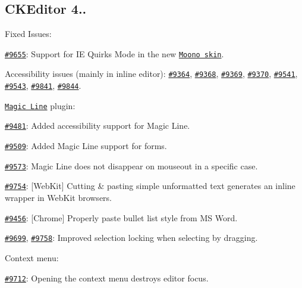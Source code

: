 \subsection*{C\-K\-Editor 4..}

Fixed Issues\-:
\begin{DoxyItemize}
\item \href{http://dev.ckeditor.com/ticket/9655}{\tt \#9655}\-: Support for I\-E Quirks Mode in the new \href{http://ckeditor.com/addon/moono}{\tt Moono skin}.
\item Accessibility issues (mainly in inline editor)\-: \href{http://dev.ckeditor.com/ticket/9364}{\tt \#9364}, \href{http://dev.ckeditor.com/ticket/9368}{\tt \#9368}, \href{http://dev.ckeditor.com/ticket/9369}{\tt \#9369}, \href{http://dev.ckeditor.com/ticket/9370}{\tt \#9370}, \href{http://dev.ckeditor.com/ticket/9541}{\tt \#9541}, \href{http://dev.ckeditor.com/ticket/9543}{\tt \#9543}, \href{http://dev.ckeditor.com/ticket/9841}{\tt \#9841}, \href{http://dev.ckeditor.com/ticket/9844}{\tt \#9844}.
\item \href{http://ckeditor.com/addon/magicline}{\tt Magic Line} plugin\-:
\begin{DoxyItemize}
\item \href{http://dev.ckeditor.com/ticket/9481}{\tt \#9481}\-: Added accessibility support for Magic Line.
\item \href{http://dev.ckeditor.com/ticket/9509}{\tt \#9509}\-: Added Magic Line support for forms.
\item \href{http://dev.ckeditor.com/ticket/9573}{\tt \#9573}\-: Magic Line does not disappear on {\ttfamily mouseout} in a specific case.
\end{DoxyItemize}
\item \href{http://dev.ckeditor.com/ticket/9754}{\tt \#9754}\-: \mbox{[}Web\-Kit\mbox{]} Cutting \& pasting simple unformatted text generates an inline wrapper in Web\-Kit browsers.
\item \href{http://dev.ckeditor.com/ticket/9456}{\tt \#9456}\-: \mbox{[}Chrome\mbox{]} Properly paste bullet list style from M\-S Word.
\item \href{http://dev.ckeditor.com/ticket/9699}{\tt \#9699}, \href{http://dev.ckeditor.com/ticket/9758}{\tt \#9758}\-: Improved selection locking when selecting by dragging.
\item Context menu\-:
\begin{DoxyItemize}
\item \href{http://dev.ckeditor.com/ticket/9712}{\tt \#9712}\-: Opening the context menu destroys editor focus.

\end{DoxyItemize}
\end{DoxyItemize}
